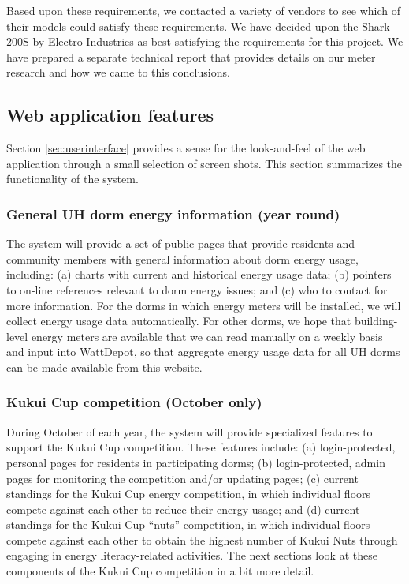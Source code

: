 \documentclass[11pt]{article}
\begin{document}
Based upon these requirements, we contacted a variety of vendors to see
which of their models could satisfy these requirements.  We have decided
upon the Shark 200S by Electro-Industries as best satisfying the requirements
for this project.  We have prepared a separate technical report \cite{Lim10} that provides details on our meter research and how we came to this conclusions. 

\subsection{Web application features}
\label{sec:features}

Section \ref{sec:userinterface} provides a sense for the look-and-feel of
the web application through a small selection of screen shots.  This section
summarizes the functionality of the system.

\subsubsection{General UH dorm energy information (year round)}  

The system will provide a set of public pages that provide residents and
community members with general information about dorm energy usage,
including: (a) charts with current and historical energy usage data; (b)
pointers to on-line references relevant to dorm energy issues; and (c) who
to contact for more information.  For the dorms in which energy meters
will be installed, we will collect energy usage data automatically.  For
other dorms, we hope that building-level energy meters are available that
we can read manually on a weekly basis and input into WattDepot, so that
aggregate energy usage data for all UH dorms can be made available from
this website.

\subsubsection{Kukui Cup competition (October only)}  

During October of each year, the system will provide specialized features
to support the Kukui Cup competition.  These features include: (a)
login-protected, personal pages for residents in participating dorms; (b)
login-protected, admin pages for monitoring the competition and/or updating
pages; (c) current standings for the Kukui Cup energy competition, in
which individual floors compete against each other to reduce their energy
usage; and (d) current standings for the Kukui Cup ``nuts'' competition, in which
individual floors compete against each other to obtain the highest number
of Kukui Nuts through engaging in energy literacy-related activities.  The
next sections look at these components of the Kukui Cup competition in a
bit more detail.
\end{document}
